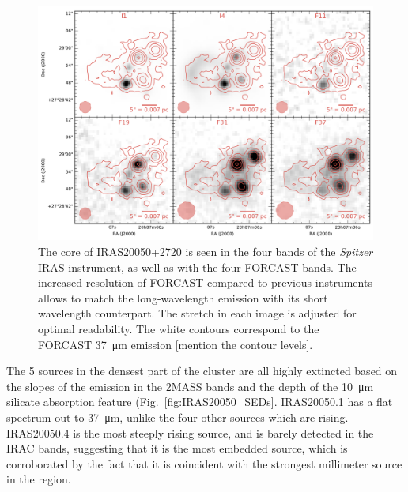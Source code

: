 \begin{landscape}
\begin{figure}
\begin{center}
\hspace*{-1.2in}
\includegraphics[width=1.4\textwidth]{Figures/IRAS20050.png}
\vspace{-0.5in}

\caption{The core of IRAS20050+2720 is seen in the four bands of the \textit{Spitzer} IRAS instrument, as well as with the four FORCAST bands. The increased resolution of FORCAST compared to previous instruments allows to match the long-wavelength emission with its short wavelength counterpart. The stretch in each image is adjusted for optimal readability. The white contours correspond to the FORCAST \SI{37}{\micro\meter} emission [mention the contour levels]. }
\label{fig:IRAS20050_mosaic}
\end{center}
\end{figure}
\end{landscape}

The 5 sources in the densest part of the cluster are all highly extincted based on the slopes of the emission in the 2MASS bands and the depth of the \SI{10}{\um} silicate absorption feature (Fig.~\ref{fig:IRAS20050_SEDs}. IRAS20050.1 has a flat spectrum out to \SI{37}{\um}, unlike the four other sources which are rising. IRAS20050.4 is the most steeply rising source, and is barely detected in the IRAC bands, suggesting that it is the most embedded source, which is corroborated by the fact that it is coincident with the strongest millimeter source in the region. 


